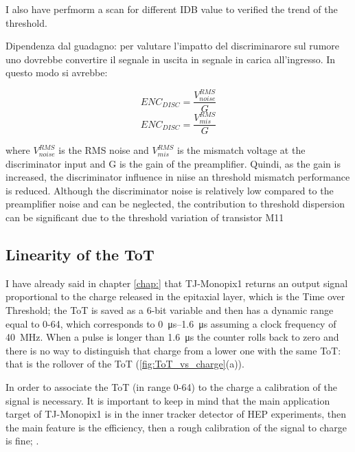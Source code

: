         I also have perfmorm a scan for different IDB value to verified the trend of the threshold. 

    Dipendenza dal guadagno: per valutare l'impatto del discriminarore sul rumore uno dovrebbe convertire il segnale in uscita in segnale in carica all'ingresso. In questo modo si avrebbe:
    \begin{multicols}{2}
        \begin{equation}
            ENC_{DISC} = \frac{V_{noise} ^ {RMS}}{G}
        \end{equation}\break
        \begin{equation}
            ENC_{DISC} = \frac{V_{mis} ^ {RMS}}{G}
        \end{equation}
        \label{eq:}
    \end{multicols}
    where $V_{noise} ^ {RMS}$ is the RMS noise and $V_{mis} ^ {RMS}$ is the mismatch voltage at the discriminator input and G is the gain of the preamplifier. 
    Quindi, as the gain is increased, the discriminator influence in niise an threshold mismatch performance is reduced. Although the discriminator noise is relatively low compared to the preamplifier noise and can be neglected, the contribution to threshold dispersion can be significant due
    to the threshold variation of transistor M11


    \subsection{Linearity of the ToT}    
        I have already said in chapter \ref{chap:} that TJ-Monopix1 returns an output signal  proportional to the charge released in the epitaxial layer, which is the Time over Threshold; the ToT is saved as a 6-bit variable and then has a dynamic range equal to 0-64, which corresponds to \SIrange{0}{1.6}{\us} assuming a clock frequency of \SI{40}{MHz}.
        When a pulse is longer than \SI{1.6}{\us} the counter rolls back to zero and there is no way to distinguish that charge from a lower one with the same ToT: that is the rollover of the ToT (\ref{fig:ToT_vs_charge}(a)).

        In order to associate the ToT (in range 0-64) to the charge a calibration of the signal is necessary. It is important to keep in mind that the main application target of TJ-Monopix1 is in the inner tracker detector of HEP experiments, then the main feature is the efficiency, then a rough calibration of the signal to charge is fine; . 
        
